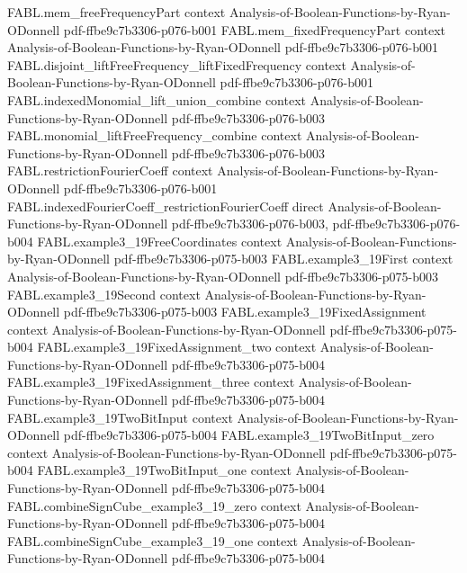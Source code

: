 \begin{theorem}
  {FABL.mem_freeFrequencyPart}
  {context}
  {Analysis-of-Boolean-Functions-by-Ryan-ODonnell}
  {pdf-ffbe9c7b3306-p076-b001}
\proofstep
  {FABL.mem_fixedFrequencyPart}
  {context}
  {Analysis-of-Boolean-Functions-by-Ryan-ODonnell}
  {pdf-ffbe9c7b3306-p076-b001}
\proofstep
  {FABL.disjoint_liftFreeFrequency_liftFixedFrequency}
  {context}
  {Analysis-of-Boolean-Functions-by-Ryan-ODonnell}
  {pdf-ffbe9c7b3306-p076-b001}
\proofstep
  {FABL.indexedMonomial_lift_union_combine}
  {context}
  {Analysis-of-Boolean-Functions-by-Ryan-ODonnell}
  {pdf-ffbe9c7b3306-p076-b003}
\proofstep
  {FABL.monomial_liftFreeFrequency_combine}
  {context}
  {Analysis-of-Boolean-Functions-by-Ryan-ODonnell}
  {pdf-ffbe9c7b3306-p076-b003}
\proofstep
  {FABL.restrictionFourierCoeff}
  {context}
  {Analysis-of-Boolean-Functions-by-Ryan-ODonnell}
  {pdf-ffbe9c7b3306-p076-b001}
\proofstep
  {FABL.indexedFourierCoeff_restrictionFourierCoeff}
  {direct}
  {Analysis-of-Boolean-Functions-by-Ryan-ODonnell}
  {pdf-ffbe9c7b3306-p076-b003,
    pdf-ffbe9c7b3306-p076-b004}
\proofstep
  {FABL.example3_19FreeCoordinates}
  {context}
  {Analysis-of-Boolean-Functions-by-Ryan-ODonnell}
  {pdf-ffbe9c7b3306-p075-b003}
\proofstep
  {FABL.example3_19First}
  {context}
  {Analysis-of-Boolean-Functions-by-Ryan-ODonnell}
  {pdf-ffbe9c7b3306-p075-b003}
\proofstep
  {FABL.example3_19Second}
  {context}
  {Analysis-of-Boolean-Functions-by-Ryan-ODonnell}
  {pdf-ffbe9c7b3306-p075-b003}
\proofstep
  {FABL.example3_19FixedAssignment}
  {context}
  {Analysis-of-Boolean-Functions-by-Ryan-ODonnell}
  {pdf-ffbe9c7b3306-p075-b004}
\proofstep
  {FABL.example3_19FixedAssignment_two}
  {context}
  {Analysis-of-Boolean-Functions-by-Ryan-ODonnell}
  {pdf-ffbe9c7b3306-p075-b004}
\proofstep
  {FABL.example3_19FixedAssignment_three}
  {context}
  {Analysis-of-Boolean-Functions-by-Ryan-ODonnell}
  {pdf-ffbe9c7b3306-p075-b004}
\proofstep
  {FABL.example3_19TwoBitInput}
  {context}
  {Analysis-of-Boolean-Functions-by-Ryan-ODonnell}
  {pdf-ffbe9c7b3306-p075-b004}
\proofstep
  {FABL.example3_19TwoBitInput_zero}
  {context}
  {Analysis-of-Boolean-Functions-by-Ryan-ODonnell}
  {pdf-ffbe9c7b3306-p075-b004}
\proofstep
  {FABL.example3_19TwoBitInput_one}
  {context}
  {Analysis-of-Boolean-Functions-by-Ryan-ODonnell}
  {pdf-ffbe9c7b3306-p075-b004}
\proofstep
  {FABL.combineSignCube_example3_19_zero}
  {context}
  {Analysis-of-Boolean-Functions-by-Ryan-ODonnell}
  {pdf-ffbe9c7b3306-p075-b004}
\proofstep
  {FABL.combineSignCube_example3_19_one}
  {context}
  {Analysis-of-Boolean-Functions-by-Ryan-ODonnell}
  {pdf-ffbe9c7b3306-p075-b004}
\proofstep

\end{theorem}
